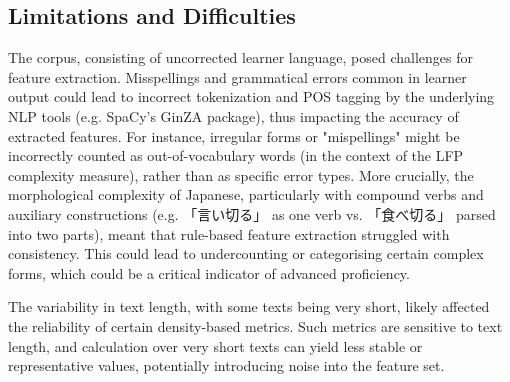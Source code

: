 \subsection{Limitations and Difficulties}


The corpus, consisting of uncorrected learner language, posed challenges for feature extraction. Misspellings and
grammatical errors common in learner output could lead to incorrect tokenization and POS tagging by the underlying
NLP tools (e.g. SpaCy's GinZA package), thus impacting the accuracy of extracted features. For instance, irregular
forms or "mispellings" might be incorrectly counted as out-of-vocabulary words (in the context of the LFP complexity
measure), rather than as specific error types. More crucially, the morphological complexity of Japanese,
particularly with compound verbs and auxiliary constructions (e.g. 「言い切る」 as one verb vs. 「食べ切る」 parsed into two
parts), meant that rule-based feature extraction struggled with consistency. This could lead to undercounting or
categorising certain complex forms, which could be a critical indicator of advanced proficiency.

The variability in text length, with some texts being very short, likely affected the reliability of certain
density-based metrics. Such metrics are sensitive to text
length, and calculation over very short texts can yield less stable or representative values, potentially
introducing noise into the feature set.

